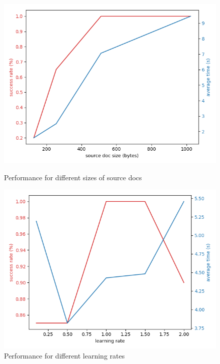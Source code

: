 \documentclass{article}
\begin{document}
\begin{figure}[t]
    \centering
    \begin{minipage}{.5\textwidth}
        \centering
        \includegraphics[width=\textwidth]{source_doc_size}
        \caption{Performance for different sizes of source docs}
        \label{fig:docsize}
    \end{minipage}%
    \begin{minipage}{.5\textwidth}
        \centering
        \includegraphics[width=\textwidth]{learning_rate}
        \caption{Performance for different learning rates} 
        \label{fig:lrate}
    \end{minipage}
\end{figure}
\end{document}
